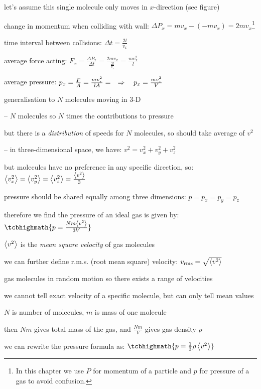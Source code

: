 let's assume this single molecule only moves in $x$-direction (see figure)

change in momentum when colliding with wall: $\Delta P_x = mv_x - (-mv_x) = 2mv_x$\footnote{In this chapter we use $P$ for momentum of a particle and $p$ for pressure of a gas to avoid confusion.}

time interval between collisions: $\Delta t=\frac{2l}{v_x}$

average force acting: $F_x=\frac{\Delta P_x}{\Delta t} = \frac{2mv_x}{\tfrac{2l}{v_x}} = \frac{mv_x^2}{l}$

average pressure: $p_x=\frac{F}{A} = \frac{mv_x^2}{lA} = \quad \Rightarrow \quad p_x = \frac{mv_x^2}{V}$

generalisation to $N$ molecules moving in 3-D

\begin{compactitem}
	\item[--] $N$ molecules so $N$ times the contributions to pressure
	
	but there is a \emph{distribution} of speeds for $N$ molecules, so should take average of $v^2$
	
	\item[--] in three-dimensional space, we have: $v^2=v_x^2 + v_y^2 + v_z^2$
	
	but molecules have no preference in any specific direction, so: $\left< v_x^2 \right> = \left< v_y^2 \right> = \left< v_z^2 \right> = \frac{\left< v^2 \right>}{3}$
	
	pressure should be shared equally among three dimensions: $p=p_x=p_y=p_z$
		
\end{compactitem}


therefore we find the pressure of an ideal gas is given by: $\tcbhighmath{p = \frac{Nm\avg{v^2}}{3V}}$

\cmt $\left< v^2 \right>$ is the \emph{mean square velocity} of gas molecules

we can further define r.m.s. (root mean square) velocity: $v_\text{rms} = \sqrt{\left< v^2 \right>}$ 

gas molecules in random motion so there exists a range of velocities

we cannot tell exact velocity of a specific molecule, but can only tell mean values

\cmt $N$ is number of molecules, $m$ is mass of one molecule

then $Nm$ gives total mass of the gas, and $\frac{Nm}{V}$ gives gas density $\rho$

we can rewrite the pressure formula as: $\tcbhighmath{p=\frac{1}{3}\rho \avg{v^2}}$ 

